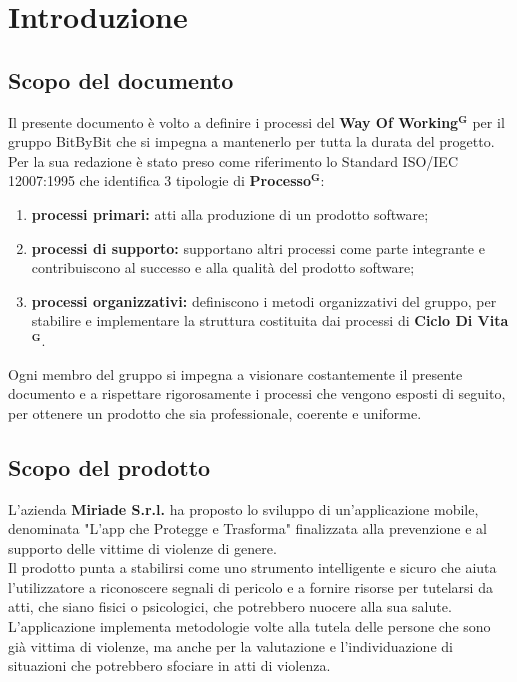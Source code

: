 \documentclass[a4paper,12pt]{article}
\newcommand{\term}[1]{\textbf{#1}$^\mathbf{G}$}
\begin{document}
\clearpage

\clearpage
\tableofcontents
\thispagestyle{empty} %
\clearpage

\listoftables
\thispagestyle{empty}
\clearpage

\section{Introduzione}
\subsection{Scopo del documento}
Il presente documento è volto a definire i processi del \term{Way Of Working} per il gruppo BitByBit che si impegna a mantenerlo per tutta la durata del progetto.
Per la sua redazione è stato preso come riferimento lo Standard ISO/IEC 12007:1995 che identifica 3 tipologie di \term{Processo}:
\begin{enumerate}
    \item \textbf{processi primari:} atti alla produzione di un prodotto software;
    \item \textbf{processi di supporto:} supportano altri processi come parte integrante e contribuiscono al successo e alla qualità del prodotto software;
    \item \textbf{processi organizzativi:} definiscono i metodi organizzativi del gruppo, per stabilire e implementare la struttura costituita dai processi di \term{Ciclo Di Vita}.
\end{enumerate}
Ogni membro del gruppo si impegna a visionare costantemente il presente documento e a rispettare rigorosamente i processi che vengono esposti di seguito, per ottenere un prodotto che sia professionale, coerente e uniforme.

\subsection{Scopo del prodotto}
L'azienda \textbf{Miriade S.r.l.} ha proposto lo sviluppo di un'applicazione mobile, denominata "L'app che Protegge e Trasforma" finalizzata alla prevenzione e al supporto delle vittime di violenze di genere. \\Il prodotto punta a stabilirsi come uno strumento intelligente e sicuro che aiuta l'utilizzatore a riconoscere segnali di pericolo e a fornire risorse per tutelarsi da atti, che siano fisici o psicologici, che potrebbero nuocere alla sua salute. L'applicazione implementa metodologie volte alla tutela delle persone che sono già vittima di violenze, ma anche per la valutazione e l'individuazione di situazioni che potrebbero sfociare in atti di violenza.
\end{document}
